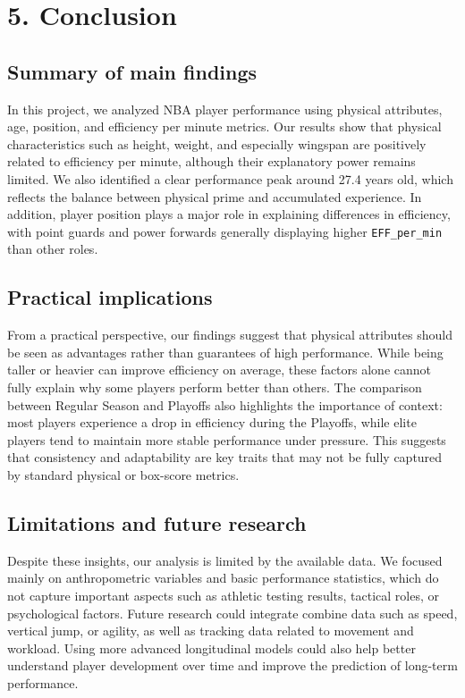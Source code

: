 \documentclass[
  letterpaper,
  DIV=11,
  numbers=noendperiod]{scrartcl}
\begin{document}
\section{5. Conclusion}\label{conclusion}

\subsection{Summary of main findings}\label{summary-of-main-findings}

In this project, we analyzed NBA player performance using physical
attributes, age, position, and efficiency per minute metrics. Our
results show that physical characteristics such as height, weight, and
especially wingspan are positively related to efficiency per minute,
although their explanatory power remains limited. We also identified a
clear performance peak around 27.4 years old, which reflects the balance
between physical prime and accumulated experience. In addition, player
position plays a major role in explaining differences in efficiency,
with point guards and power forwards generally displaying higher
\texttt{EFF\_per\_min} than other roles.

\subsection{Practical implications}\label{practical-implications}

From a practical perspective, our findings suggest that physical
attributes should be seen as advantages rather than guarantees of high
performance. While being taller or heavier can improve efficiency on
average, these factors alone cannot fully explain why some players
perform better than others. The comparison between Regular Season and
Playoffs also highlights the importance of context: most players
experience a drop in efficiency during the Playoffs, while elite players
tend to maintain more stable performance under pressure. This suggests
that consistency and adaptability are key traits that may not be fully
captured by standard physical or box-score metrics.

\subsection{Limitations and future
research}\label{limitations-and-future-research}

Despite these insights, our analysis is limited by the available data.
We focused mainly on anthropometric variables and basic performance
statistics, which do not capture important aspects such as athletic
testing results, tactical roles, or psychological factors. Future
research could integrate combine data such as speed, vertical jump, or
agility, as well as tracking data related to movement and workload.
Using more advanced longitudinal models could also help better
understand player development over time and improve the prediction of
long-term performance.
\end{document}
